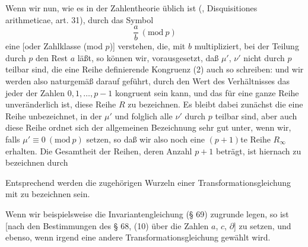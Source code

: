 
Wenn wir nun, wie es in der Zahlentheorie üblich ist (, Disquisitiones arithmeticae, art. 31), durch das Symbol
\[
\frac{a}{b} \ (\mathrm{mod}\ p)
\]
eine  [oder Zahlklasse (mod $p$)] verstehen, die, mit $b$ multipliziert, bei der Teilung durch $p$ den Rest $a$ läßt, so können wir, vorausgesetzt, daß $\mu'$, $\nu'$ nicht durch $p$ teilbar sind, die eine Reihe definierende Kongruenz (2) auch so schreiben:
und wir werden also naturgemäß darauf geführt, durch den Wert des Verhältnisses
das jeder der Zahlen $0, 1, \ldots, p-1$ kongruent sein kann, und das für eine ganze Reihe unveränderlich ist, diese Reihe $R$ zu bezeichnen. Es bleibt dabei zunächst die eine Reihe unbezeichnet, in der $\mu'$ und folglich alle $\nu'$ durch $p$ teilbar sind, aber auch diese Reihe ordnet sich der allgemeinen Bezeichnung sehr gut unter, wenn wir, falls $\mu' \equiv 0 \ (\mathrm{mod}\ p)$
setzen, so daß wir also noch eine $(p+1)$te Reihe $R_\infty$ erhalten. Die Gesamtheit der Reihen, deren Anzahl $p+1$ beträgt, ist hiernach zu bezeichnen durch

Entsprechend werden die zugehörigen Wurzeln einer Transformationsgleichung mit
zu bezeichnen sein.

Wenn wir beispielsweise die Invariantengleichung (§ 69) zugrunde legen, so ist [nach den Bestimmungen des § 68, (10) über die Zahlen $a$, $c$, $\partial$]
zu setzen, und ebenso, wenn irgend eine andere Transformationsgleichung gewählt wird.
